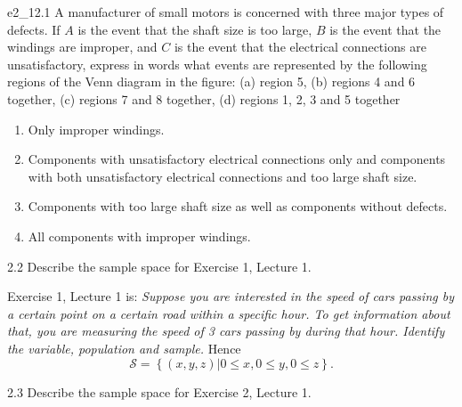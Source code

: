 
\begin{problemwithimage}{e2_1}{2.1}
  A manufacturer of small motors is concerned with three major types of defects.
  If $A$ is the event that the shaft size is too large, $B$ is the event that the windings are improper, and $C$ is the event that the electrical connections are unsatisfactory, express in words what events are represented by the following regions of the Venn diagram in the figure:
  (a) region 5, (b) regions 4 and 6 together, (c) regions 7 and 8 together, (d) regions 1, 2, 3 and 5 together
\end{problemwithimage}

\begin{derivation}
  \begin{enumerate}[label=(\alph*)]
    \item Only improper windings.
    \item Components with unsatisfactory electrical connections only and components with both unsatisfactory electrical connections and too large shaft size.
    \item Components with too large shaft size as well as components without defects.
    \item All components with improper windings.
  \end{enumerate}
\end{derivation}

\begin{problem}{2.2}
  Describe the sample space for Exercise 1, Lecture 1.
\end{problem}

\begin{derivation}
  Exercise 1, Lecture 1 is:
  \textit{Suppose you are interested in the speed of cars passing by a certain point on a certain road within a specific hour. To get information about that, you are measuring the speed of 3 cars passing by during that hour. Identify the variable, population and sample.}
  Hence
  \begin{equation*}
    \mathcal{S} = \left\{ (x,y,z) | 0 \leq x, 0 \leq y, 0 \leq z \right\}
  .\end{equation*}
\end{derivation}


\begin{problem}{2.3}
  Describe the sample space for Exercise 2, Lecture 1.
\end{problem}

